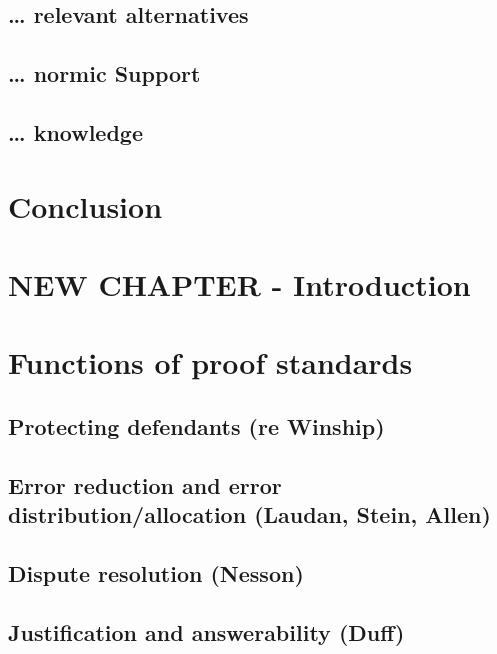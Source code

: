 \documentclass[10pt,dvipsnames]{scrartcl}
\begin{document}
\subsection{\ldots{} relevant
alternatives}\label{relevant-alternatives-1}

\subsection{\ldots{} normic Support}\label{normic-support-1}

\subsection{\ldots{} knowledge}\label{knowledge-1}

\section{Conclusion}\label{conclusion}

\section{NEW CHAPTER - Introduction}\label{new-chapter---introduction-1}

\section{Functions of proof
standards}\label{functions-of-proof-standards}

\subsection{Protecting defendants (re
Winship)}\label{protecting-defendants-re-winship}

\subsection{Error reduction and error distribution/allocation (Laudan,
Stein,
Allen)}\label{error-reduction-and-error-distributionallocation-laudan-stein-allen}

\subsection{Dispute resolution
(Nesson)}\label{dispute-resolution-nesson}

\subsection{Justification and answerability
(Duff)}\label{justification-and-answerability-duff}
\end{document}
